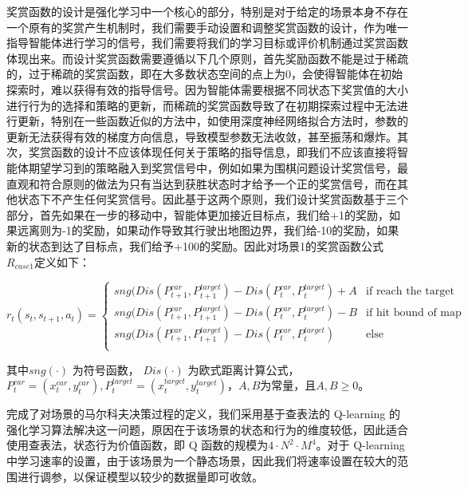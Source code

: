\documentclass{standalone}
\begin{document}
奖赏函数的设计是强化学习中一个核心的部分，特别是对于给定的场景本身不存在一个原有的奖赏产生机制时，我们需要手动设置和调整奖赏函数的设计，作为唯一指导智能体进行学习的信号，我们需要将我们的学习目标或评价机制通过奖赏函数体现出来。而设计奖赏函数需要遵循以下几个原则，首先奖励函数不能是过于稀疏的，过于稀疏的奖赏函数，即在大多数状态空间的点上为0，会使得智能体在初始探索时，难以获得有效的指导信号。因为智能体需要根据不同状态下奖赏值的大小进行行为的选择和策略的更新，而稀疏的奖赏函数导致了在初期探索过程中无法进行更新，特别在一些函数近似的方法中，如使用深度神经网络拟合方法时，参数的更新无法获得有效的梯度方向信息，导致模型参数无法收敛，甚至振荡和爆炸。其次，奖赏函数的设计不应该体现任何关于策略的指导信息，即我们不应该直接将智能体期望学习到的策略融入到奖赏信号中，例如如果为围棋问题设计奖赏信号，最直观和符合原则的做法为只有当达到获胜状态时才给予一个正的奖赏信号，而在其他状态下不产生任何奖赏信号。因此基于这两个原则，我们设计奖赏函数基于三个部分，首先如果在一步的移动中，智能体更加接近目标点，我们给+1的奖励，如果远离则为-1的奖励，如果动作导致其行驶出地图边界，我们给-10的奖励，如果新的状态到达了目标点，我们给予+100的奖励。因此对场景1的奖赏函数公式$R_{case1}$定义如下：
\begin{center}
    \begin{equation}
    \label{rewardcase1}
    r_t(s_t, s_{t+1}, a_t) = \begin{cases}
     sng(Dis(P_{t+1}^{car}, P_{t+1}^{target}) - Dis(P_{t}^{car}, P_{t}^{target}) + A &\mbox{if reach the target}\\
     sng(Dis(P_{t+1}^{car}, P_{t+1}^{target}) - Dis(P_{t}^{car}, P_{t}^{target}) - B &\mbox{if hit bound of map}\\
     sng(Dis(P_{t+1}^{car}, P_{t+1}^{target}) - Dis(P_{t}^{car}, P_{t}^{target}) &\mbox{else}\\
     \end{cases}
    \end{equation}
\end{center}
其中$sng(\cdot)$ 为符号函数， $Dis(\cdot)$ 为欧式距离计算公式，$P_{t}^{car} = (x_t^{car}, y_t^{car}), P_{t}^{target} = (x^{target}_t, y^{target}_t)$，$A,B$为常量，且$A, B \geq 0$。\par

完成了对场景的马尔科夫决策过程的定义，我们采用基于查表法的 Q-learning 的强化学习算法解决这一问题，原因在于该场景的状态和行为的维度较低，因此适合使用查表法，状态行为价值函数，即 Q 函数的规模为$4\cdot N^2\cdot M^4$。对于 Q-learning 中学习速率的设置，由于该场景为一个静态场景，因此我们将速率设置在较大的范围进行调参，以保证模型以较少的数据量即可收敛。
\end{document}
